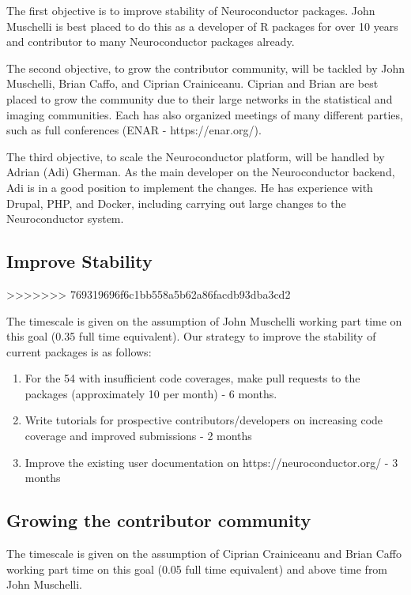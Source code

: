 \documentclass[]{elsarticle} %
\providecommand{\tightlist}{%
  \setlength{\itemsep}{0pt}\setlength{\parskip}{0pt}}
\begin{document}
The first objective is to improve stability of Neuroconductor packages.
John Muschelli is best placed to do this as a developer of R packages
for over 10 years and contributor to many Neuroconductor packages
already.

The second objective, to grow the contributor community, will be tackled
by John Muschelli, Brian Caffo, and Ciprian Crainiceanu. Ciprian and
Brian are best placed to grow the community due to their large networks
in the statistical and imaging communities. Each has also organized
meetings of many different parties, such as full conferences (ENAR -
https://enar.org/).

The third objective, to scale the Neuroconductor platform, will be
handled by Adrian (Adi) Gherman. As the main developer on the
Neuroconductor backend, Adi is in a good position to implement the
changes. He has experience with Drupal, PHP, and Docker, including
carrying out large changes to the Neuroconductor system.

\subsection{Improve Stability}\label{improve-stability}
>>>>>>> 769319696f6c1bb558a5b62a86facdb93dba3cd2

The timescale is given on the assumption of John Muschelli working part
time on this goal (0.35 full time equivalent). Our strategy to improve
the stability of current packages is as follows:

\begin{enumerate}
\def\labelenumi{\arabic{enumi}.}
\tightlist
\item
  For the 54 with insufficient code coverages, make pull requests to the
  packages (approximately 10 per month) - 6 months.\\
\item
  Write tutorials for prospective contributors/developers on increasing
  code coverage and improved submissions - 2 months
\item
  Improve the existing user documentation on https://neuroconductor.org/
  - 3 months
\end{enumerate}

\subsection{Growing the contributor
community}\label{growing-the-contributor-community-1}

The timescale is given on the assumption of Ciprian Crainiceanu and
Brian Caffo working part time on this goal (0.05 full time equivalent)
and above time from John Muschelli.
\end{document}
